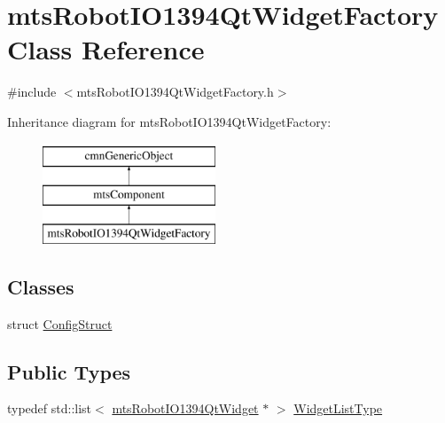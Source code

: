 \hypertarget{classmts_robot_i_o1394_qt_widget_factory}{}\section{mts\+Robot\+I\+O1394\+Qt\+Widget\+Factory Class Reference}
\label{classmts_robot_i_o1394_qt_widget_factory}


{\ttfamily \#include $<$mts\+Robot\+I\+O1394\+Qt\+Widget\+Factory.\+h$>$}

Inheritance diagram for mts\+Robot\+I\+O1394\+Qt\+Widget\+Factory\+:\begin{figure}[H]
\begin{center}
\leavevmode
\includegraphics[height=3.000000cm]{d5/d69/classmts_robot_i_o1394_qt_widget_factory}
\end{center}
\end{figure}
\subsection*{Classes}
\begin{DoxyCompactItemize}
\item 
struct \hyperlink{structmts_robot_i_o1394_qt_widget_factory_1_1_config_struct}{Config\+Struct}
\end{DoxyCompactItemize}
\subsection*{Public Types}
\begin{DoxyCompactItemize}
\item 
typedef std\+::list$<$ \hyperlink{classmts_robot_i_o1394_qt_widget}{mts\+Robot\+I\+O1394\+Qt\+Widget} $\ast$ $>$ \hyperlink{classmts_robot_i_o1394_qt_widget_factory_aaa614e39fe48800dab4b21edf6845c22}{Widget\+List\+Type}
\end{DoxyCompactItemize}
